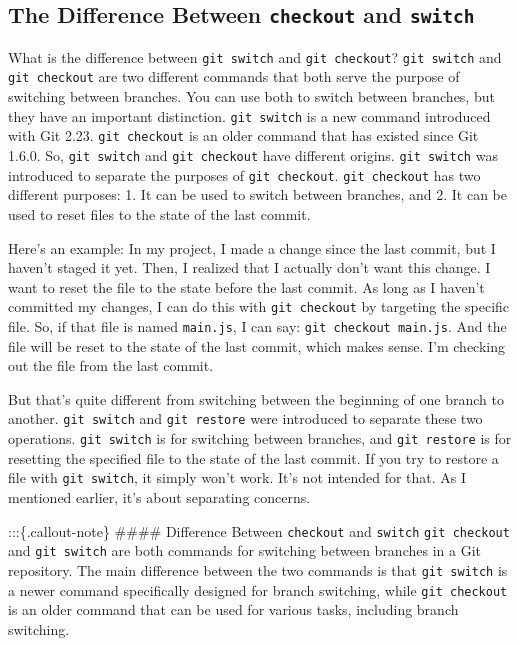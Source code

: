 \documentclass[
  letterpaper,
  DIV=11,
  numbers=noendperiod]{scrreprt}
\begin{document}
\subsection{\texorpdfstring{The Difference Between \texttt{checkout} and
\texttt{switch}}{The Difference Between checkout and switch}}\label{the-difference-between-checkout-and-switch}

What is the difference between \texttt{git\ switch} and
\texttt{git\ checkout}? \texttt{git\ switch} and \texttt{git\ checkout}
are two different commands that both serve the purpose of switching
between branches. You can use both to switch between branches, but they
have an important distinction. \texttt{git\ switch} is a new command
introduced with Git 2.23. \texttt{git\ checkout} is an older command
that has existed since Git 1.6.0. So, \texttt{git\ switch} and
\texttt{git\ checkout} have different origins. \texttt{git\ switch} was
introduced to separate the purposes of \texttt{git\ checkout}.
\texttt{git\ checkout} has two different purposes: 1. It can be used to
switch between branches, and 2. It can be used to reset files to the
state of the last commit.

Here's an example: In my project, I made a change since the last commit,
but I haven't staged it yet. Then, I realized that I actually don't want
this change. I want to reset the file to the state before the last
commit. As long as I haven't committed my changes, I can do this with
\texttt{git\ checkout} by targeting the specific file. So, if that file
is named \texttt{main.js}, I can say: \texttt{git\ checkout\ main.js}.
And the file will be reset to the state of the last commit, which makes
sense. I'm checking out the file from the last commit.

But that's quite different from switching between the beginning of one
branch to another. \texttt{git\ switch} and \texttt{git\ restore} were
introduced to separate these two operations. \texttt{git\ switch} is for
switching between branches, and \texttt{git\ restore} is for resetting
the specified file to the state of the last commit. If you try to
restore a file with \texttt{git\ switch}, it simply won't work. It's not
intended for that. As I mentioned earlier, it's about separating
concerns.

:::\{.callout-note\} \#\#\#\# Difference Between \texttt{checkout} and
\texttt{switch} \texttt{git\ checkout} and \texttt{git\ switch} are both
commands for switching between branches in a Git repository. The main
difference between the two commands is that \texttt{git\ switch} is a
newer command specifically designed for branch switching, while
\texttt{git\ checkout} is an older command that can be used for various
tasks, including branch switching.
\end{document}
